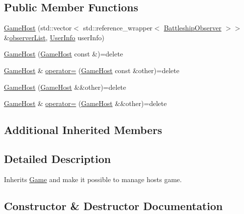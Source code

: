 \subsection*{Public Member Functions}
\begin{DoxyCompactItemize}
\item 
\hyperlink{classMODEL_1_1GameHost_af4c7d7c228fb6a53529d42e5cf663454}{Game\+Host} (std\+::vector$<$ std\+::reference\+\_\+wrapper$<$ \hyperlink{classBattleshipObserver}{Battleship\+Observer} $>$$>$ \&\hyperlink{classMODEL_1_1Game_afada2cb52f9872db4f3ab6e72d07cd05}{observer\+List}, \hyperlink{classUserInfo}{User\+Info} user\+Info)
\item 
\hyperlink{classMODEL_1_1GameHost_a80f71e5ed2203e72e6316cd576f34b20}{Game\+Host} (\hyperlink{classMODEL_1_1GameHost}{Game\+Host} const \&)=delete
\item 
\hyperlink{classMODEL_1_1GameHost}{Game\+Host} \& \hyperlink{classMODEL_1_1GameHost_a0ea4d71078c853546b5e20eb4456c52c}{operator=} (\hyperlink{classMODEL_1_1GameHost}{Game\+Host} const \&other)=delete
\item 
\hyperlink{classMODEL_1_1GameHost_a2f8ceef0f550ba2a56d02634eba1e578}{Game\+Host} (\hyperlink{classMODEL_1_1GameHost}{Game\+Host} \&\&other)=delete
\item 
\hyperlink{classMODEL_1_1GameHost}{Game\+Host} \& \hyperlink{classMODEL_1_1GameHost_a9e001ceb501503e01025415889d8e3a1}{operator=} (\hyperlink{classMODEL_1_1GameHost}{Game\+Host} \&\&other)=delete
\end{DoxyCompactItemize}
\subsection*{Additional Inherited Members}


\subsection{Detailed Description}
Inherits \hyperlink{classMODEL_1_1Game}{Game} and make it possible to manage hosts game. 

\subsection{Constructor \& Destructor Documentation}
